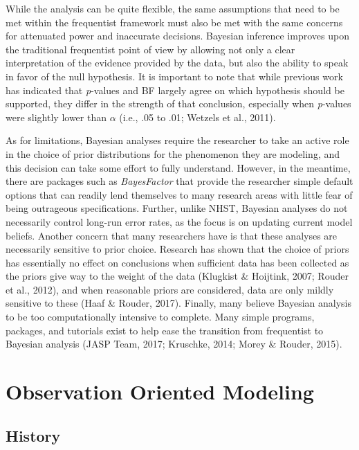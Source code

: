 \documentclass[,man, mask]{apa6}
\theoremstyle{definition}
\theoremstyle{definition}
\theoremstyle{definition}
\theoremstyle{remark}
\begin{document}
While the analysis can be quite flexible, the same assumptions that need
to be met within the frequentist framework must also be met with the
same concerns for attenuated power and inaccurate decisions. Bayesian
inference improves upon the traditional frequentist point of view by
allowing not only a clear interpretation of the evidence provided by the
data, but also the ability to speak in favor of the null hypothesis. It
is important to note that while previous work has indicated that
\emph{p}-values and BF largely agree on which hypothesis should be
supported, they differ in the strength of that conclusion, especially
when \emph{p}-values were slightly lower than \(\alpha\) (i.e., .05 to
.01; Wetzels et al., 2011).

As for limitations, Bayesian analyses require the researcher to take an
active role in the choice of prior distributions for the phenomenon they
are modeling, and this decision can take some effort to fully
understand. However, in the meantime, there are packages such as
\emph{BayesFactor} that provide the researcher simple default options
that can readily lend themselves to many research areas with little fear
of being outrageous specifications. Further, unlike NHST, Bayesian
analyses do not necessarily control long-run error rates, as the focus
is on updating current model beliefs. Another concern that many
researchers have is that these analyses are necessarily sensitive to
prior choice. Research has shown that the choice of priors has
essentially no effect on conclusions when sufficient data has been
collected as the priors give way to the weight of the data (Klugkist \&
Hoijtink, 2007; Rouder et al., 2012), and when reasonable priors are
considered, data are only mildly sensitive to these (Haaf \& Rouder,
2017). Finally, many believe Bayesian analysis to be too computationally
intensive to complete. Many simple programs, packages, and tutorials
exist to help ease the transition from frequentist to Bayesian analysis
(JASP Team, 2017; Kruschke, 2014; Morey \& Rouder, 2015). \newline
\newline

\section{Observation Oriented
Modeling}\label{observation-oriented-modeling}

\subsection{History}\label{history-2}
\end{document}
